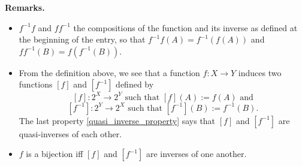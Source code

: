 \documentclass[12pt]{article}
\begin{document}
\textbf{Remarks.}  
\begin{itemize}
\item $f^{-1}f$ and $ff^{-1}$  the compositions of the function and its inverse as defined at the beginning of the entry, so that $f^{-1}f(A)=f^{-1}(f(A))$ and $ff^{-1}(B)=f(f^{-1}(B))$.
\item From the definition above, we see that a function $f:X\to Y$ induces two functions $[f]$ and $[f^{-1}]$ defined by
$$[f]:2^X\to 2^Y\mbox{ such that }[f](A):=f(A)\mbox{ and}$$
$$[f^{-1}]:2^Y\to 2^X\mbox{ such that }[f^{-1}](B):=f^{-1}(B).$$
The last property \ref{quasi_inverse_property} says that $[f]$ and $[f^{-1}]$ are quasi-inverses of each other.
\item $f$ is a bijection iff $[f]$ and $[f^{-1}]$ are inverses of one another.
\end{itemize}
\end{document}
